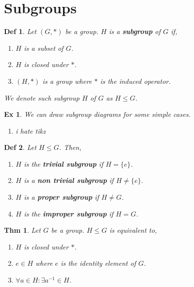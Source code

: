 \documentclass[paper=a4, fontsize=11pt]{scrartcl}
\newtheorem{theorem}{Thm}
\newtheorem{definition}{Def}
\newtheorem{example}{Ex}
\begin{document}
\vspace{0.25in}

\section{Subgroups}
\vspace{0.25in}

\begin{definition}
	Let $(G,\ast)$ be a group. $H$ is a \textbf{subgroup} of $G$ if, 
	\begin{enumerate}
		\item $H$ is a subset of $G$.
		\item $H$ is closed under $\ast$.
		\item $(H,\ast)$ is a group where $\ast$ is the induced operator. 
	\end{enumerate}
	We denote such subgroup $H$ of $G$ as $H \leqslant G$.\\
\end{definition}

\begin{example}
	We can draw subgroup diagrams for some simple cases.
	\begin{enumerate}
		\item i hate tikz \\
	\end{enumerate}
\end{example}

\begin{definition}
	Let $H \leqslant G$. Then,
	\begin{enumerate}
		\item $H$ is the \textbf{trivial subgroup} if $H=\{e\}$.
		\item $H$ is a \textbf{non trivial subgroup} if $H \neq \{e\}$.
		\item $H$ is a \textbf{proper subgroup} if $H \neq G$.
		\item $H$ is the \textbf{improper subgroup} if $H = G$. \\
	\end{enumerate}
\end{definition}

\begin{theorem}
	Let $G$ be a group. $H \leqslant G$ is equivalent to, 
	\begin{enumerate}
		\item $H$ is closed under $\ast$.
		\item $e \in H$ where $e$ is the identity element of $G$.
		\item $\forall a \in H : \exists a^{-1} \in H$. \\
	\end{enumerate}
\end{theorem}
\end{document}
